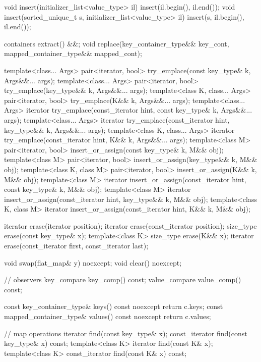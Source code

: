 \begin{codeblock}
{{    void insert(initializer_list<value_type> il)
      { insert(il.begin(), il.end()); }
    void insert(sorted_unique_t s, initializer_list<value_type> il)
      { insert(s, il.begin(), il.end()); }

    containers extract() &&;
    void replace(key_container_type&& key_cont, mapped_container_type&& mapped_cont);

    template<class... Args>
      pair<iterator, bool> try_emplace(const key_type& k, Args&&... args);
    template<class... Args>
      pair<iterator, bool> try_emplace(key_type&& k, Args&&... args);
    template<class K, class... Args>
      pair<iterator, bool> try_emplace(K&& k, Args&&... args);
    template<class... Args>
      iterator try_emplace(const_iterator hint, const key_type& k, Args&&... args);
    template<class... Args>
      iterator try_emplace(const_iterator hint, key_type&& k, Args&&... args);
    template<class K, class... Args>
      iterator try_emplace(const_iterator hint, K&& k, Args&&... args);
    template<class M>
      pair<iterator, bool> insert_or_assign(const key_type& k, M&& obj);
    template<class M>
      pair<iterator, bool> insert_or_assign(key_type&& k, M&& obj);
    template<class K, class M>
      pair<iterator, bool> insert_or_assign(K&& k, M&& obj);
    template<class M>
      iterator insert_or_assign(const_iterator hint, const key_type& k, M&& obj);
    template<class M>
      iterator insert_or_assign(const_iterator hint, key_type&& k, M&& obj);
    template<class K, class M>
      iterator insert_or_assign(const_iterator hint, K&& k, M&& obj);

    iterator erase(iterator position);
    iterator erase(const_iterator position);
    size_type erase(const key_type& x);
    template<class K> size_type erase(K&& x);
    iterator erase(const_iterator first, const_iterator last);

    void swap(flat_map& y) noexcept;
    void clear() noexcept;

    // observers
    key_compare key_comp() const;
    value_compare value_comp() const;

    const key_container_type& keys() const noexcept      { return c.keys; }
    const mapped_container_type& values() const noexcept { return c.values; }

    // map operations
    iterator find(const key_type& x);
    const_iterator find(const key_type& x) const;
    template<class K> iterator find(const K& x);
    template<class K> const_iterator find(const K& x) const;

}}
\end{codeblock}
